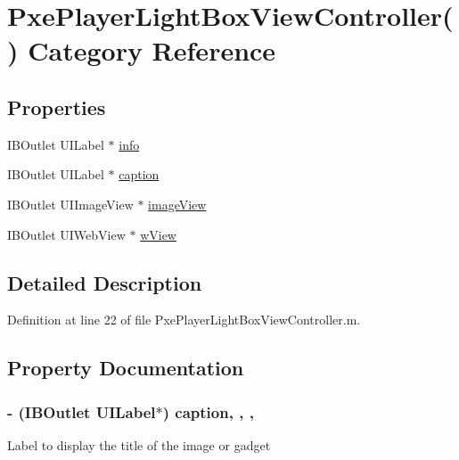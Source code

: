 \hypertarget{category_pxe_player_light_box_view_controller_07_08}{\section{Pxe\-Player\-Light\-Box\-View\-Controller() Category Reference}
\label{category_pxe_player_light_box_view_controller_07_08}
}
\subsection*{Properties}
\begin{DoxyCompactItemize}
\item 
I\-B\-Outlet U\-I\-Label $\ast$ \hyperlink{category_pxe_player_light_box_view_controller_07_08_a754a4ef5b70d22c93867ef86763deea2}{info}
\item 
I\-B\-Outlet U\-I\-Label $\ast$ \hyperlink{category_pxe_player_light_box_view_controller_07_08_a5bcc63386d137a4305c4ab196f0ecd56}{caption}
\item 
I\-B\-Outlet U\-I\-Image\-View $\ast$ \hyperlink{category_pxe_player_light_box_view_controller_07_08_a683c2dc890d472035ed660510611b177}{image\-View}
\item 
I\-B\-Outlet U\-I\-Web\-View $\ast$ \hyperlink{category_pxe_player_light_box_view_controller_07_08_a48cc80b9f885fd8abbff0f1ea380582b}{w\-View}
\end{DoxyCompactItemize}


\subsection{Detailed Description}


Definition at line 22 of file Pxe\-Player\-Light\-Box\-View\-Controller.\-m.



\subsection{Property Documentation}
\hypertarget{category_pxe_player_light_box_view_controller_07_08_a5bcc63386d137a4305c4ab196f0ecd56}{
\subsubsection[{caption}]{\setlength{\rightskip}{0pt plus 5cm}-\/ (I\-B\-Outlet U\-I\-Label$\ast$) caption\hspace{0.3cm}{\ttfamily [read]}, {\ttfamily [write]}, {\ttfamily [nonatomic]}, {\ttfamily [weak]}}}\label{category_pxe_player_light_box_view_controller_07_08_a5bcc63386d137a4305c4ab196f0ecd56}
Label to display the title of the image or gadget 


